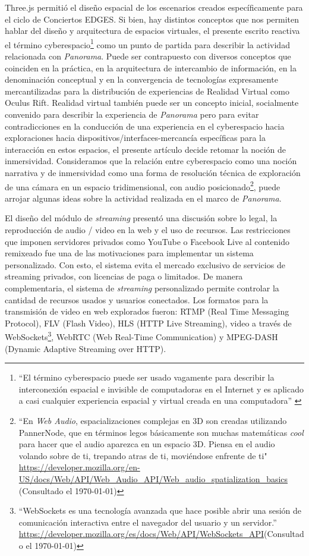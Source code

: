 Three.js permitió el diseño espacial de los escenarios creados específicamente para el ciclo de Conciertos EDGES. Si bien, hay distintos conceptos que nos permiten hablar del diseño y arquitectura de espacios virtuales, el presente escrito reactiva el término cyberespacio\footnote{``El término cyberespacio puede ser usado vagamente para describir la interconexión espacial e invisible de computadoras en el Internet y es aplicado a casi cualquier experiencia espacial y virtual creada en una computadora'' \citep{cyberspace}} como un punto de partida para describir la actividad relacionada con \textit{Panorama}. Puede ser contrapuesto con diversos conceptos que coinciden en la práctica, en la arquitectura de intercambio de información, en la denominación conceptual y en la convergencia de tecnologías expresamente mercantilizadas para la distribución de experiencias de Realidad Virtual como Oculus Rift. Realidad virtual también puede ser un concepto inicial, socialmente convenido para describir la experiencia de \textit{Panorama} pero para evitar contradicciones en la conducción de una experiencia en el cyberespacio hacia exploraciones hacia dispositivos/interfaces-mercancía específicas para la interacción en estos espacios, el presente artículo decide retomar la noción de inmersividad. Consideramos que la relación entre cyberespacio como una noción narrativa y de inmersividad como una forma de resolución técnica de exploración de una cámara en un espacio tridimensional, con audio posicionado\footnote{``En \textit{Web Audio}, espacializaciones complejas en 3D son creadas utilizando PannerNode, que en términos legos básicamente son muchas matemáticas \textit{cool} para hacer que el audio aparezca en un espacio 3D. Piensa en el audio volando sobre de ti, trepando atras de ti, moviéndose enfrente de ti" \url{https://developer.mozilla.org/en-US/docs/Web/API/Web_Audio_API/Web_audio_spatialization_basics} (Consultado el \today)}, puede arrojar algunas ideas sobre la actividad realizada en el marco de \textit{Panorama}. %

\color{black}

El diseño del módulo de \textit{streaming} presentó una discusión sobre lo legal, la reproducción de audio / video en la web y el uso de recursos. Las restricciones que imponen servidores privados como YouTube o Facebook Live al contenido remixeado fue una de las motivaciones para implementar un sistema personalizado. Con esto, el sistema evita el mercado exclusivo de servicios de streaming privados, con licencias de paga o limitados. De manera complementaria, el sistema de \textit{streaming} personalizado permite controlar la cantidad de recursos usados y usuarios conectados. Los formatos para la transmisión de video en web explorados fueron: RTMP (Real Time Messaging Protocol), FLV (Flash Video), HLS (HTTP Live Streaming), video a través de WebSockets\footnote{``WebSockets es una tecnología avanzada que hace posible abrir una sesión de comunicación interactiva entre el navegador del usuario y un servidor.'' \url{https://developer.mozilla.org/es/docs/Web/API/WebSockets_API}(Consultado el \today)}, WebRTC (Web Real-Time Communication) y MPEG-DASH (Dynamic Adaptive Streaming over HTTP).

